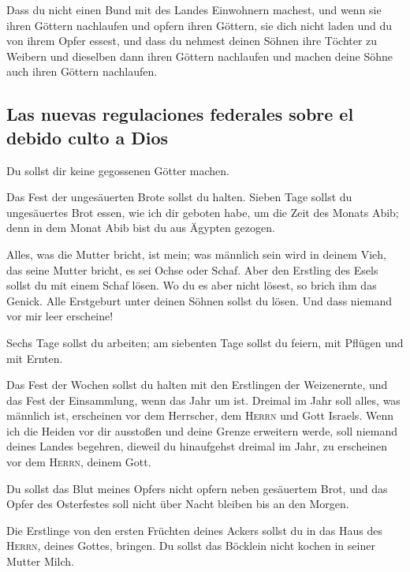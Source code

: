  Dass du nicht einen Bund mit des Landes Einwohnern
machest, und wenn sie ihren Göttern nachlaufen und opfern ihren Göttern,
sie dich nicht laden und du von ihrem Opfer essest,  und
dass du nehmest deinen Söhnen ihre Töchter zu Weibern und dieselben dann
ihren Göttern nachlaufen und machen deine Söhne auch ihren Göttern
nachlaufen.

\hypertarget{las-nuevas-regulaciones-federales-sobre-el-debido-culto-a-dios}{%
\subsection{Las nuevas regulaciones federales sobre el debido culto a
Dios}\label{las-nuevas-regulaciones-federales-sobre-el-debido-culto-a-dios}}

 Du sollst dir keine gegossenen Götter machen.

 Das Fest der ungesäuerten Brote sollst du halten. Sieben
Tage sollst du ungesäuertes Brot essen, wie ich dir geboten habe, um die
Zeit des Monats Abib; denn in dem Monat Abib bist du aus Ägypten
gezogen.

 Alles, was die Mutter bricht, ist mein; was männlich
sein wird in deinem Vieh, das seine Mutter bricht, es sei Ochse oder
Schaf.  Aber den Erstling des Esels sollst du mit einem
Schaf lösen. Wo du es aber nicht lösest, so brich ihm das Genick. Alle
Erstgeburt unter deinen Söhnen sollst du lösen. Und dass niemand vor mir
leer erscheine!

 Sechs Tage sollst du arbeiten; am siebenten Tage sollst
du feiern, mit Pflügen und mit Ernten.

 Das Fest der Wochen sollst du halten mit den Erstlingen
der Weizenernte, und das Fest der Einsammlung, wenn das Jahr um ist.
 Dreimal im Jahr soll alles, was männlich ist, erscheinen
vor dem Herrscher, dem \textsc{Herrn} und Gott Israels. 
Wenn ich die Heiden vor dir ausstoßen und deine Grenze erweitern werde,
soll niemand deines Landes begehren, dieweil du hinaufgehst dreimal im
Jahr, zu erscheinen vor dem \textsc{Herrn}, deinem Gott.

 Du sollst das Blut meines Opfers nicht opfern neben
gesäuertem Brot, und das Opfer des Osterfestes soll nicht über Nacht
bleiben bis an den Morgen.

 Die Erstlinge von den ersten Früchten deines Ackers
sollst du in das Haus des \textsc{Herrn}, deines Gottes, bringen. Du
sollst das Böcklein nicht kochen in seiner Mutter Milch.

